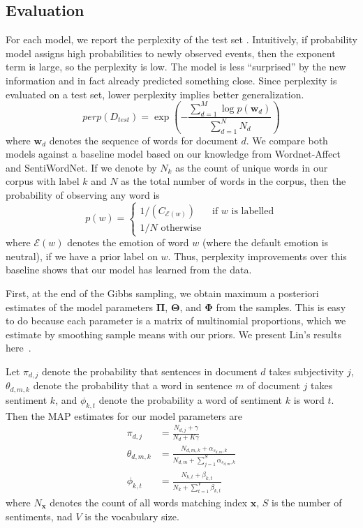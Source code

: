 \documentclass{article}
\begin{document}
\subsection{Evaluation}
For each model, we report the perplexity of the test set \citep{blei03}.
Intuitively, if probability model assigns high probabilities to
newly observed events, then the exponent term is large, so the
perplexity is low. The model is less ``surprised'' by the new
information and in fact already predicted something close. Since
perplexity is evaluated on a test set, lower perplexity implies
better generalization.
\begin{equation}
perp(D_{test}) = \exp{\left(-\frac{\sum_{d=1}^M \log{p(\mathbf{w}_d)}}{\sum_{d=1}^N N_d}\right)}
\end{equation}
where $\mathbf{w}_d$ denotes the sequence of words for document
$d$. We compare both models against a baseline model based on our
knowledge from Wordnet-Affect and SentiWordNet. If we denote by
$N_k$ as the count of unique words in our corpus with label $k$ and
$N$ as the total number of words in the corpus, then the probability
of observing any word is
\begin{equation}
p(w) = \begin{cases} 1 / \left( {C_{\mathcal{E}(w)}} \right) & \mbox{if } w \mbox{ is labelled} \\
                     1/ N \mbox{ otherwise }
       \end{cases}
\end{equation}
where $\mathcal{E}(w)$ denotes the emotion of word $w$ (where the
default emotion is neutral), if we have a prior label on $w$. Thus,
perplexity improvements over this baseline shows that our model has
learned from the data.

First, at the end of the Gibbs sampling, we obtain maximum a
posteriori estimates of the model parameters $\mathbf{\Pi}$,
$\mathbf{\Theta}$, and $\mathbf{\Phi}$ from the samples. This is
easy to do because each parameter is a matrix of multinomial
proportions, which we estimate by smoothing sample means with our
priors. We present Lin's results here~\citep{lin03}.

Let $\pi_{d,j}$ denote the probability that sentences in document
$d$ takes subjectivity $j$, $\theta_{d,m,k}$ denote the probability
that a word in sentence $m$ of document $j$ takes sentiment $k$,
and $\phi_{k,t}$ denote the probability a word of sentiment $k$ is
word $t$. Then the MAP estimates for our model parameters are
\begin{align}
\pi_{d,j}      &= \frac{N_{d,j} + \gamma}{N_d + K\gamma} \\
\theta_{d,m,k} &= \frac{N_{d,m,k} + \alpha_{s_{d,m},k}}{N_{d,m} + \sum_{j=1}^S \alpha_{s_{d,m},k}} \\
\phi_{k,t}     &= \frac{N_{k,t} + \beta_{k,t}}{N_k + \sum_{t=1}^V \beta_{k,t}}
\end{align}
where $N_{\mathbf{x}}$ denotes the count of all words matching
index $\mathbf{x}$, $S$ is the number of sentiments, nad $V$ is the
vocabulary size.
\end{document}
